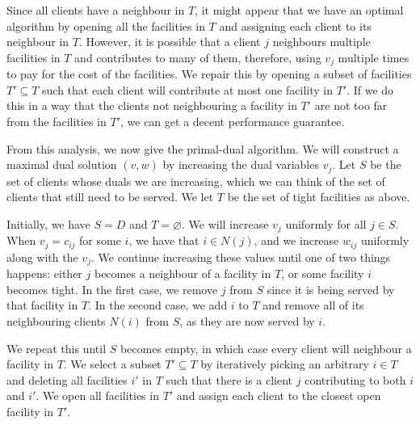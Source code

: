 Since all clients have a neighbour in $T$, 
it might appear that we have an optimal algorithm by opening all the 
facilities in $T$ and assigning each client to its neighbour in $T$. However, 
it is possible that a client $j$ neighbours multiple facilities in $T$
and contributes to many of them, therefore, using $v_j$ multiple times 
to pay for the cost of the facilities. We repair this by opening a 
subset of facilities $T' \subseteq T$ such that each client will contribute at 
most one facility in $T'$. If we do this in a way that the clients 
not neighbouring a facility in $T'$ are not too far from the facilities in $T'$, 
we can get a decent performance guarantee. 

From this analysis, we now give the primal-dual algorithm. We will construct 
a maximal dual solution $(v, w)$ by increasing the dual variables $v_j$. 
Let $S$ be the set of clients whose duals we are increasing, which 
we can think of the set of clients that still need to be served. 
We let $T$ be the set of tight facilities as above. 

Initially, we have $S = D$ and $T = \varnothing$. We will increase $v_j$ uniformly 
for all $j \in S$. When $v_j = c_{ij}$ for some $i$, we have 
that $i \in N(j)$, and we increase $w_{ij}$ uniformly along with the $v_j$. 
We continue increasing these values until one of two things happens: either $j$ 
becomes a neighbour of a facility in $T$, or some facility $i$ becomes tight.
In the first case, we remove $j$ from $S$ since it is being served by 
that facility in $T$. In the second case, we add $i$ to $T$ 
and remove all of its neighbouring clients $N(i)$ from $S$, as they are now 
served by $i$. 

We repeat this until $S$ becomes empty, in which case every client will 
neighbour a facility in $T$. We select a subset $T' \subseteq T$ by iteratively 
picking an arbitrary $i \in T$ and deleting all facilities $i'$ in $T$ such that 
there is a client $j$ contributing to both $i$ and $i'$. We open all facilities 
in $T'$ and assign each client to the closest open facility in $T'$. 

